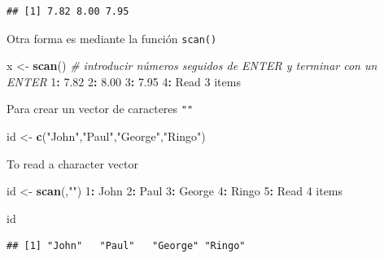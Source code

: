 \documentclass[]{book}
\newenvironment{Shaded}{\begin{snugshade}}{\end{snugshade}}
\newcommand{\KeywordTok}[1]{\textcolor[rgb]{0.13,0.29,0.53}{\textbf{#1}}}
\newcommand{\DecValTok}[1]{\textcolor[rgb]{0.00,0.00,0.81}{#1}}
\newcommand{\FloatTok}[1]{\textcolor[rgb]{0.00,0.00,0.81}{#1}}
\newcommand{\StringTok}[1]{\textcolor[rgb]{0.31,0.60,0.02}{#1}}
\newcommand{\CommentTok}[1]{\textcolor[rgb]{0.56,0.35,0.01}{\textit{#1}}}
\newcommand{\OperatorTok}[1]{\textcolor[rgb]{0.81,0.36,0.00}{\textbf{#1}}}
\newcommand{\NormalTok}[1]{#1}
\begin{document}
\begin{verbatim}
## [1] 7.82 8.00 7.95
\end{verbatim}

Otra forma es mediante la función \texttt{scan()}

\begin{Shaded}
\begin{Highlighting}[]
\NormalTok{x <-}\StringTok{ }\KeywordTok{scan}\NormalTok{()  }\CommentTok{# introducir números seguidos de ENTER y terminar con un ENTER}
\DecValTok{1}\OperatorTok{:}\StringTok{ }\FloatTok{7.82}
\DecValTok{2}\OperatorTok{:}\StringTok{ }\FloatTok{8.00}
\DecValTok{3}\OperatorTok{:}\StringTok{ }\FloatTok{7.95}
\DecValTok{4}\OperatorTok{:}\StringTok{ }
\NormalTok{Read }\DecValTok{3}\NormalTok{ items}
\end{Highlighting}
\end{Shaded}

Para crear un vector de caracteres \texttt{""}

\begin{Shaded}
\begin{Highlighting}[]
\NormalTok{id <-}\StringTok{ }\KeywordTok{c}\NormalTok{(}\StringTok{"John"}\NormalTok{,}\StringTok{"Paul"}\NormalTok{,}\StringTok{"George"}\NormalTok{,}\StringTok{"Ringo"}\NormalTok{)}
\end{Highlighting}
\end{Shaded}

To read a character vector

\begin{Shaded}
\begin{Highlighting}[]
\NormalTok{id <-}\StringTok{ }\KeywordTok{scan}\NormalTok{(,}\StringTok{""}\NormalTok{)}
\DecValTok{1}\OperatorTok{:}\StringTok{ }\NormalTok{John}
\DecValTok{2}\OperatorTok{:}\StringTok{ }\NormalTok{Paul}
\DecValTok{3}\OperatorTok{:}\StringTok{ }\NormalTok{George}
\DecValTok{4}\OperatorTok{:}\StringTok{ }\NormalTok{Ringo}
\DecValTok{5}\OperatorTok{:}\StringTok{ }
\NormalTok{Read }\DecValTok{4}\NormalTok{ items  }
\end{Highlighting}
\end{Shaded}

\begin{Shaded}
\begin{Highlighting}[]
\NormalTok{id}
\end{Highlighting}
\end{Shaded}

\begin{verbatim}
## [1] "John"   "Paul"   "George" "Ringo"
\end{verbatim}
\end{document}
